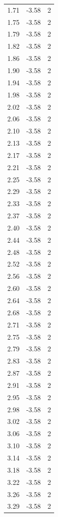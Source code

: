 \begin{longtable}{lrr}
  1.71 & -3.58 & 2 \\
  1.75 & -3.58 & 2 \\
  1.79 & -3.58 & 2 \\
  1.82 & -3.58 & 2 \\
  1.86 & -3.58 & 2 \\
  1.90 & -3.58 & 2 \\
  1.94 & -3.58 & 2 \\
  1.98 & -3.58 & 2 \\
  2.02 & -3.58 & 2 \\
  2.06 & -3.58 & 2 \\
  2.10 & -3.58 & 2 \\
  2.13 & -3.58 & 2 \\
  2.17 & -3.58 & 2 \\
  2.21 & -3.58 & 2 \\
  2.25 & -3.58 & 2 \\
  2.29 & -3.58 & 2 \\
  2.33 & -3.58 & 2 \\
  2.37 & -3.58 & 2 \\
  2.40 & -3.58 & 2 \\
  2.44 & -3.58 & 2 \\
  2.48 & -3.58 & 2 \\
  2.52 & -3.58 & 2 \\
  2.56 & -3.58 & 2 \\
  2.60 & -3.58 & 2 \\
  2.64 & -3.58 & 2 \\
  2.68 & -3.58 & 2 \\
  2.71 & -3.58 & 2 \\
  2.75 & -3.58 & 2 \\
  2.79 & -3.58 & 2 \\
  2.83 & -3.58 & 2 \\
  2.87 & -3.58 & 2 \\
  2.91 & -3.58 & 2 \\
  2.95 & -3.58 & 2 \\
  2.98 & -3.58 & 2 \\
  3.02 & -3.58 & 2 \\
  3.06 & -3.58 & 2 \\
  3.10 & -3.58 & 2 \\
  3.14 & -3.58 & 2 \\
  3.18 & -3.58 & 2 \\
  3.22 & -3.58 & 2 \\
  3.26 & -3.58 & 2 \\
  3.29 & -3.58 & 2 \\

\end{longtable}
